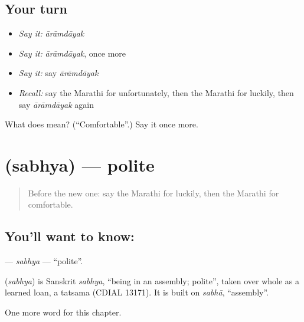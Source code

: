 \subsection*{Your turn}
\begin{itemize}
\raggedright
  \item \emph{Say it:} \emph{ārāmdāyak}
  \item \emph{Say it:} \emph{ārāmdāyak}, once more
  \item \emph{Say it:} say \emph{ārāmdāyak}
  \item \emph{Recall:} say the Marathi for unfortunately, then the Marathi for luckily, then say \emph{ārāmdāyak} again
\end{itemize}

\begin{tcolorbox}[breakable,colback=teal!4,colframe=teal!35!black,title={Before you move on}]
What does  mean? (\textquotedblleft{}Comfortable\textquotedblright{}.) Say it once more.
\end{tcolorbox}
\section[\texorpdfstring{\mr{सभ्य} (sabhya)}{सभ्य (sabhya)}]{ (sabhya) — polite}

\label{lesson:MR-C174-sabhya}



\begin{quote}
Before the new one: say the Marathi for luckily, then the Marathi for comfortable.
\end{quote}

\subsection*{You'll want to know: }
\textbf{} — \emph{sabhya} — \textquotedblleft{}polite\textquotedblright{}.

\begin{cousinweb}
\textbf{} (\emph{sabhya}) is Sanskrit \emph{sabhya}, \textquotedblleft{}being in an assembly; polite\textquotedblright{}, taken over whole as a learned loan, a tatsama (CDIAL 13171). It is built on \emph{sabhā}, \textquotedblleft{}assembly\textquotedblright{}.
\end{cousinweb}

\begin{grammarlens}[title={What you've built}]
One more word for this chapter.
\end{grammarlens}

